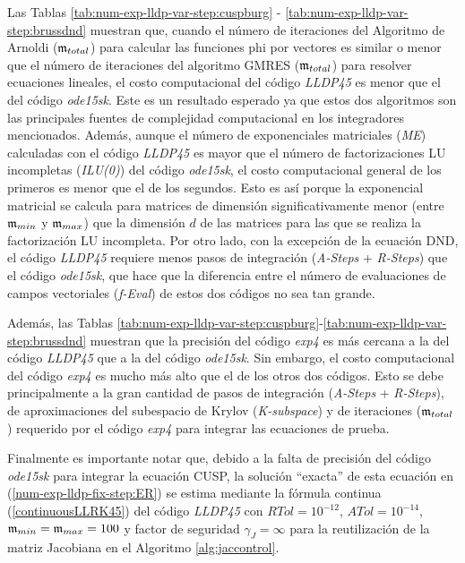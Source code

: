 Las Tablas \ref{tab:num-exp-lldp-var-step:cuspburg} - \ref{tab:num-exp-lldp-var-step:brussdnd} muestran que, cuando el número de iteraciones del Algoritmo de Arnoldi ($\mathfrak{m}_{total}$) para calcular las funciones phi por vectores es similar o menor que el número de iteraciones del algoritmo GMRES ($\mathfrak{m}_{total}$) para resolver ecuaciones lineales, el costo computacional del código \emph{LLDP45} es menor que el del código \emph{ode15sk}. Este es un resultado esperado ya que estos dos algoritmos son las principales fuentes de complejidad computacional en los integradores mencionados. Además, aunque el número de exponenciales matriciales (\textit{ME}) calculadas con el código \emph{LLDP45} es mayor que el número de factorizaciones LU incompletas (\textit{ILU(0)}) del código \emph{ode15sk}, el costo computacional general de los primeros es menor que el de los segundos. Esto es así porque la exponencial matricial se calcula para matrices de dimensión significativamente menor (entre $\mathfrak{m}_{min}$ y $\mathfrak{m}_{max}$) que la dimensión $d$ de las matrices para las que se realiza la factorización LU incompleta. Por otro lado, con la excepción de la ecuación DND, el código \emph{LLDP45} requiere menos pasos de integración (\textit{A-Steps} + \textit{R-Steps}) que el código \emph{ode15sk}, que hace que la diferencia entre el número de evaluaciones de campos vectoriales (\textit{f-Eval}) de estos dos códigos no sea tan grande.

Además, las Tablas \ref{tab:num-exp-lldp-var-step:cuspburg}-\ref{tab:num-exp-lldp-var-step:brussdnd} muestran que la precisión del código \emph{exp4} es más cercana a la del código \emph{LLDP45} que a la del código \emph{ode15sk}. Sin embargo, el costo computacional del código \emph{exp4} es mucho más alto que el de los otros dos códigos. Esto se debe principalmente a la gran cantidad de pasos de integración (\textit{A-Steps} + \textit{R-Steps}), de aproximaciones del subespacio de Krylov (\textit{K-subspace}) y de iteraciones ($\mathfrak{m}_ {total}$) requerido por el código \emph{exp4} para integrar las ecuaciones de prueba.

Finalmente es importante notar que, debido a la falta de precisión del código \emph{ode15sk} para integrar la ecuación CUSP, la solución ``exacta'' de esta ecuación en (\ref{num-exp-lldp-fix-step:ER}) se estima mediante la fórmula continua (\ref{continuousLLRK45}) del código \emph{LLDP45} con $RTol = 10^{-12}$, $ATol = 10^{-14}$, $\mathfrak{m}_{min} = \mathfrak{m}_{max} = 100$ y factor de seguridad $\gamma_J=\infty$ para la reutilización de la matriz Jacobiana en el Algoritmo \ref{alg:jaccontrol}.

